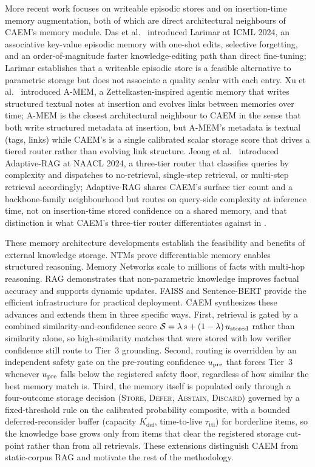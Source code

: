 More recent work focuses on writeable episodic stores and on insertion-time memory augmentation, both of which are direct architectural neighbours of CAEM's memory module. Das et al.~\cite{larimar2024das} introduced Larimar at ICML 2024, an associative key-value episodic memory with one-shot edits, selective forgetting, and an order-of-magnitude faster knowledge-editing path than direct fine-tuning; Larimar establishes that a writeable episodic store is a feasible alternative to parametric storage but does not associate a quality scalar with each entry. Xu et al.~\cite{xu2025amem} introduced A-MEM, a Zettelkasten-inspired agentic memory that writes structured textual notes at insertion and evolves links between memories over time; A-MEM is the closest architectural neighbour to CAEM in the sense that both write structured metadata at insertion, but A-MEM's metadata is textual (tags, links) while CAEM's is a single calibrated scalar storage score that drives a tiered router rather than evolving link structure. Jeong et al.~\cite{jeong2024adaptive} introduced Adaptive-RAG at NAACL 2024, a three-tier router that classifies queries by complexity and dispatches to no-retrieval, single-step retrieval, or multi-step retrieval accordingly; Adaptive-RAG shares CAEM's surface tier count and a backbone-family neighbourhood but routes on query-side complexity at inference time, not on insertion-time stored confidence on a shared memory, and that distinction is what CAEM's three-tier router differentiates against in .

These memory architecture developments establish the feasibility and benefits of external knowledge storage. NTMs prove differentiable memory enables structured reasoning. Memory Networks scale to millions of facts with multi-hop reasoning. RAG demonstrates that non-parametric knowledge improves factual accuracy and supports dynamic updates. FAISS and Sentence-BERT provide the efficient infrastructure for practical deployment. CAEM synthesizes these advances and extends them in three specific ways. First, retrieval is gated by a combined similarity-and-confidence score $\mathcal{S} = \lambda\, s + (1-\lambda)\, u_{\text{stored}}$ rather than similarity alone, so high-similarity matches that were stored with low verifier confidence still route to Tier~3 grounding. Second, routing is overridden by an independent safety gate on the pre-routing confidence $u_{\text{pre}}$ that forces Tier~3 whenever $u_{\text{pre}}$ falls below the registered safety floor, regardless of how similar the best memory match is. Third, the memory itself is populated only through a four-outcome storage decision (\textsc{Store}, \textsc{Defer}, \textsc{Abstain}, \textsc{Discard}) governed by a fixed-threshold rule on the calibrated probability composite, with a bounded deferred-reconsider buffer (capacity $K_{\text{def}}$, time-to-live $\tau_{\text{ttl}}$) for borderline items, so the knowledge base grows only from items that clear the registered storage cut-point rather than from all retrievals. These extensions distinguish CAEM from static-corpus RAG and motivate the rest of the methodology.

